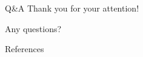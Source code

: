 \documentclass[pdf]{beamer}
\begin{document}
\begin{frame}{Q\&A}
    \centering
    \Huge{Thank you for your attention!}

    \vspace{0.5cm}

    \Large{Any questions?}
\end{frame}
\begin{frame}[allowframebreaks]{References}
    
\end{frame}
\end{document}
